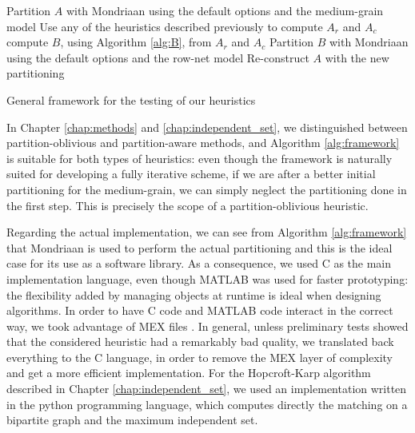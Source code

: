 \begin{algorithm}[h]
	\begin{algorithmic}
		\State Partition $A$ with Mondriaan using the default options and the medium-grain model
		\State Use any of the heuristics described previously to compute $A_r$ and $A_c$
		\State compute $B$, using Algorithm \ref{alg:B}, from $A_r$ and $A_c$
		\State Partition $B$ with Mondriaan using the default options and the row-net model
		\State Re-construct $A$ with the new partitioning
		\EndFor
	\end{algorithmic}
	\caption{General framework for the testing of our heuristics} \label{alg:framework}
\end{algorithm}

In Chapter \ref{chap:methods} and \ref{chap:independent_set}, we distinguished between partition-oblivious and partition-aware methods, and Algorithm \ref{alg:framework} is suitable for both types of heuristics: even though the framework is naturally suited for developing a fully iterative scheme, if we are after a better initial partitioning for the medium-grain, we can simply neglect the partitioning done in the first step. This is precisely the scope of a partition-oblivious heuristic.

Regarding the actual implementation, we can see from Algorithm \ref{alg:framework} that Mondriaan is used to perform the actual partitioning and this is the ideal case for its use as a software library. As a consequence, we used C as the main implementation language, even though MATLAB was used for faster prototyping: the flexibility added by managing objects at runtime  is ideal when designing algorithms. In order to have C code and MATLAB code interact in the correct way, we took advantage of MEX files \cite{mex}. In general, unless preliminary tests showed that the considered heuristic had a remarkably bad quality, we translated back everything to the C language, in order to remove the MEX layer of complexity and get a more efficient implementation. For the Hopcroft-Karp algorithm described in Chapter \ref{chap:independent_set}, we used an implementation \cite{hkarp_impl} written in the python programming language, which computes directly the matching on a bipartite graph and the maximum independent set. 

